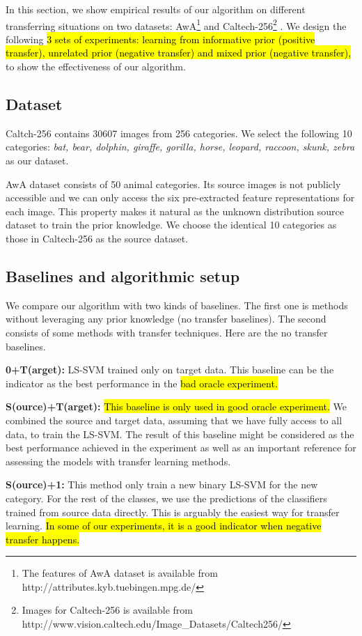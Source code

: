 In this section, we show empirical results of our algorithm on different transferring situations on two datasets: AwA\footnote{The features of AwA dataset is available from http://attributes.kyb.tuebingen.mpg.de/} \cite{lampert2009learning} and Caltech-256\footnote{Images for Caltech-256 is available from http://www.vision.caltech.edu/Image\_Datasets/Caltech256/} \cite{griffin2007caltech}. We design the following \hl{3 sets of experiments: learning from informative prior (positive transfer), unrelated prior (negative transfer) and mixed prior (negative transfer), } to show the effectiveness of our algorithm.
\subsection{Dataset}
Caltch-256 contains 30607 images from 256 categories. We select the following 10 categories: \textit{bat, bear, dolphin, giraffe, gorilla, horse, leopard, raccoon, skunk, zebra} as our dataset.

AwA dataset consists of 50 animal categories. Its source images is not publicly accessible and we can only access the six pre-extracted feature representations for each image. This property makes it natural as the unknown distribution source dataset to train the prior knowledge. We choose the identical 10 categories as those in Caltech-256 as the source dataset.

\subsection{Baselines and algorithmic setup}
We compare our algorithm with two kinds of baselines. The first one is methods without leveraging any prior knowledge (no transfer baselines). The second consists of some methods with transfer techniques. Here are the no transfer baselines.

\textbf{0+T(arget):} LS-SVM trained only on target data. This baseline can be the indicator as the best performance in the \hl{bad oracle experiment.}

\textbf{S(ource)+T(arget):} \hl{This baseline is only used in good oracle experiment.} We combined the source and target data, assuming that we have fully access to all data, to train the LS-SVM. The result of this baseline might be considered as the best performance achieved in the experiment as well as an important reference for assessing the models with transfer learning methods.

\textbf{S(ource)+1:} This method only train a new binary LS-SVM for the new category. For the rest of the classes, we use the predictions of the classifiers trained from source data directly. This is arguably the easiest way for transfer learning. \hl{In some of our experiments, it is a good indicator when negative transfer happens.}

